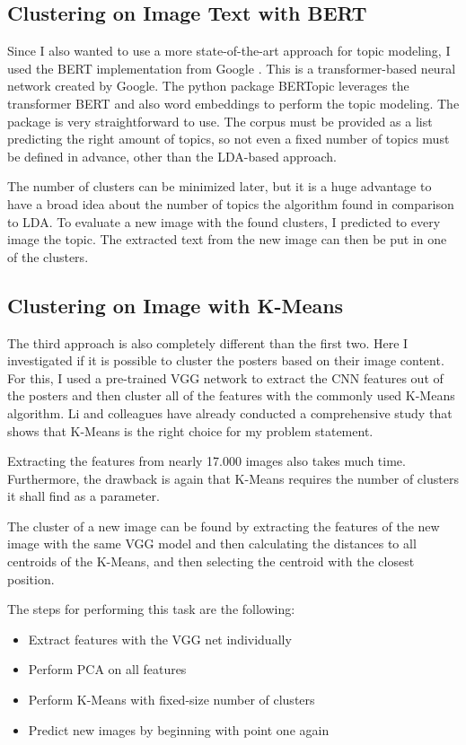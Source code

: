 \documentclass[conference]{IEEEtran}
\begin{document}
\subsection{Clustering on Image Text with BERT}

Since I also wanted to use a more state-of-the-art approach for topic modeling, I used the BERT implementation from Google \cite{Devlin.2019}. This is a transformer-based neural network created by Google. The python package BERTopic leverages the transformer BERT and also word embeddings to perform the topic modeling. The package is very straightforward to use. The corpus must be provided as a list predicting the right amount of topics, so not even a fixed number of topics must be defined in advance, other than the LDA-based approach.

The number of clusters can be minimized later, but it is a huge advantage to have a broad idea about the number of topics the algorithm found in comparison to LDA. To evaluate a new image with the found clusters, I predicted to every image the topic. The extracted text from the new image can then be put in one of the clusters.

\subsection{Clustering on Image with K-Means}

The third approach is also completely different than the first two. Here I investigated if it is possible to cluster the posters based on their image content. For this, I used a pre-trained VGG network to extract the CNN features out of the posters and then cluster all of the features with the commonly used K-Means algorithm. Li and colleagues have already conducted a comprehensive study \cite{Li.2012} that shows that K-Means is the right choice for my problem statement.

Extracting the features from nearly 17.000 images also takes much time. Furthermore, the drawback is again that K-Means requires the number of clusters it shall find as a parameter. 

The cluster of a new image can be found by extracting the features of the new image with the same VGG model and then calculating the distances to all centroids of the K-Means, and then selecting the centroid with the closest position. 

The steps for performing this task are the following:

\begin{itemize}
\item Extract features with the VGG net individually
\item Perform PCA on all features
\item Perform K-Means with fixed-size number of clusters
\item Predict new images by beginning with point one again
\end{itemize}
\end{document}
